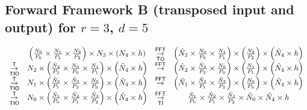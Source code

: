 \subsection{Forward Framework B (transposed input and output) for \texorpdfstring{$r=3$, $d=5$}{r=3 and d=5}}
\setlength{\arraycolsep}{2pt}
\begin{equation*}
  \begin{array}{cccc}
    & \left(\frac{N_0}{P_0} \times \frac{N_1}{P_1}  \times \frac{N_2}{P_2}\right) \times N_3 \times \left(N_4 \times h\right)
    & \overset{\textsf{FFT}}{\underset{\textsf{TO}}{\rightarrow}} & \left(\hat N_3 \times \frac{N_0}{P_0} \times \frac{N_1}{P_1}\right)  \times \left(\frac{N_2}{P_2}\right) \times \left(\hat N_4 \times h\right) \\
    \overset{\textsf{T}}{\underset{\textsf{TIO}}{\rightarrow}} & N_2 \times \left(\frac{\hat N_3}{P_2} \times \frac{N_0}{P_0} \times \frac{N_1}{P_1} \right) \times \left( \hat N_4 \times h\right)
    & \overset{\textsf{FFT}}{\rightarrow} & \left(\hat N_2 \times \frac{\hat N_3}{P_2} \times \frac{N_0}{P_0}\right) \times \left(\frac{N_1}{P_1}\right) \times \left(\hat N_4 \times h\right) \\
    \overset{\textsf{T}}{\underset{\textsf{TIO}}{\rightarrow}} & N_1 \times \left(\frac{\hat N_2}{P_1} \times \frac{\hat N_3}{P_2} \times \frac{N_0}{P_0}\right) \times \left( \hat N_4 \times h\right)
    & \overset{\textsf{FFT}}{\rightarrow} & \left(\hat N_1 \times \frac{\hat N_2}{P_1} \times \frac{\hat N_3}{P_2}\right) \times \left(\frac{N_0}{P_0}\right) \times \left(\hat N_4 \times h\right) \\
    \overset{\textsf{T}}{\underset{\textsf{TIO}}{\rightarrow}} & N_0 \times \left(\frac{\hat N_1}{P_0} \times \frac{\hat N_2}{P_1} \times \frac{\hat N_3}{P_2}\right) \times \left(\hat N_4 \times h\right)
    & \overset{\textsf{FFT}}{\underset{\textsf{TI}}{\rightarrow}} & \frac{\hat N_1}{P_0} \times \frac{\hat N_2}{P_1} \times \frac{\hat N_3}{P_2} \times \hat N_0 \times \hat N_4 \times h
  \end{array}
\end{equation*}

\newpage
